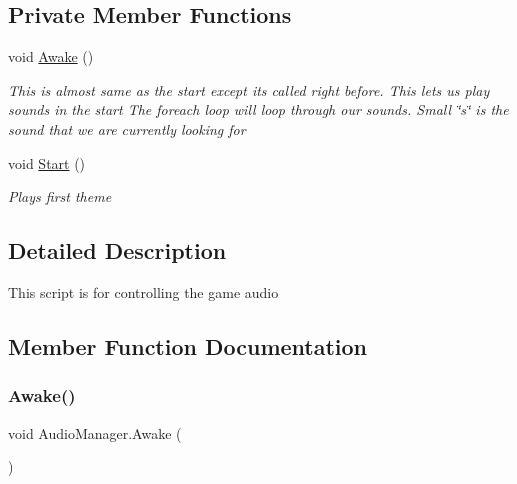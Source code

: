 \subsection*{Private Member Functions}
\begin{DoxyCompactItemize}
\item 
void \mbox{\hyperlink{class_audio_manager_a631d7d42b921bcbd82bd1baec2ec3ea7}{Awake}} ()
\begin{DoxyCompactList}\small\item\em This is almost same as the start except it\textquotesingle{}s called right before. This let\textquotesingle{}s us play sounds in the start The foreach loop will loop through our sounds. Small \char`\"{}s\char`\"{} is the sound that we are currently looking for \end{DoxyCompactList}\item 
void \mbox{\hyperlink{class_audio_manager_ab333270dca5bf5c039de3d70ca111ba9}{Start}} ()
\begin{DoxyCompactList}\small\item\em Plays first theme \end{DoxyCompactList}\end{DoxyCompactItemize}


\subsection{Detailed Description}
This script is for controlling the game audio 



\subsection{Member Function Documentation}
\mbox{\label{class_audio_manager_a631d7d42b921bcbd82bd1baec2ec3ea7}} 
\subsubsection{\texorpdfstring{Awake()}{Awake()}}
{\footnotesize\ttfamily void Audio\+Manager.\+Awake (\begin{DoxyParamCaption}{ }\end{DoxyParamCaption})\hspace{0.3cm}{\ttfamily [private]}}



